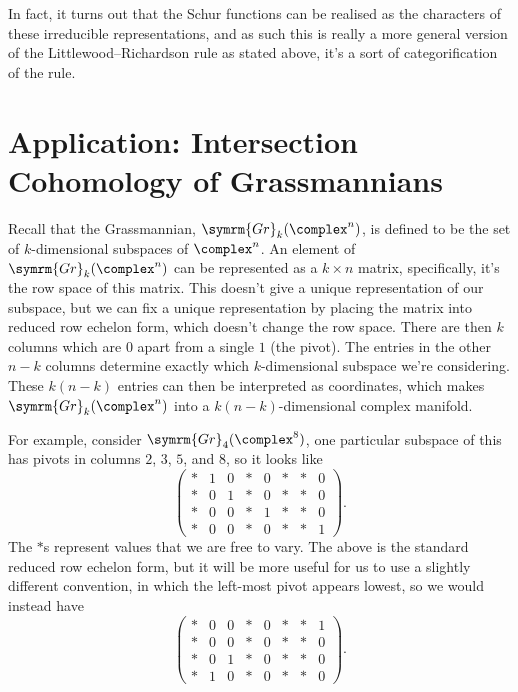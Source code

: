 \documentclass[fleqn]{NotesClass}
\newcommand{\Gr}{\symrm{Gr}}
\begin{document}
    In fact, it turns out that the Schur functions can be realised as the characters of these irreducible representations, and as such this is really a more general version of the Littlewood--Richardson rule as stated above, it's a sort of categorification of the rule.
    
    \section{Application: Intersection Cohomology of Grassmannians}
    Recall that the Grassmannian, \(\Gr_k(\complex^n)\), is defined to be the set of \(k\)-dimensional subspaces of \(\complex^n\).
    An element of \(\Gr_k(\complex^n)\) can be represented as a \(k \times n\) matrix, specifically, it's the row space of this matrix.
    This doesn't give a unique representation of our subspace, but we can fix a unique representation by placing the matrix into reduced row echelon form, which doesn't change the row space.
    There are then \(k\) columns which are \(0\) apart from a single \(1\) (the pivot).
    The entries in the other \(n - k\) columns determine exactly which \(k\)-dimensional subspace we're considering.
    These \(k(n-k)\) entries can then be interpreted as coordinates, which makes \(\Gr_k(\complex^n)\) into a \(k(n - k)\)-dimensional complex manifold.
    
    For example, consider \(\Gr_4(\complex^8)\), one particular subspace of this has pivots in columns \(2\), \(3\), \(5\), and \(8\), so it looks like
    \begin{equation}
        \begin{pmatrix}
            * & 1 & 0 & * & 0 & * & * & 0\\
            * & 0 & 1 & * & 0 & * & * & 0\\
            * & 0 & 0 & * & 1 & * & * & 0\\
            * & 0 & 0 & * & 0 & * & * & 1
        \end{pmatrix}
        .
    \end{equation}
    The \(*\)s represent values that we are free to vary.
    The above is the standard reduced row echelon form, but it will be more useful for us to use a slightly different convention, in which the left-most pivot appears lowest, so we would instead have
    \begin{equation}
        \begin{pmatrix}
            * & 0 & 0 & * & 0 & * & * & 1\\
            * & 0 & 0 & * & 0 & * & * & 0\\
            * & 0 & 1 & * & 0 & * & * & 0\\
            * & 1 & 0 & * & 0 & * & * & 0
        \end{pmatrix}
        .
    \end{equation}
    
\end{document}
